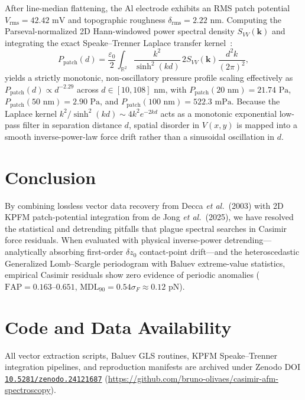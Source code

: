 \documentclass[10pt,twocolumn,a4paper]{article}
\begin{document}
After line-median flattening, the Al electrode exhibits an RMS patch potential $V_{\mathrm{rms}} = 42.42\text{ mV}$ and topographic roughness $\delta_{\mathrm{rms}} = 2.22\text{ nm}$. Computing the Parseval-normalized 2D Hann-windowed power spectral density $S_{VV}(\mathbf{k})$ and integrating the exact Speake--Trenner Laplace transfer kernel~\cite{speake2003}:
\begin{equation}
P_{\mathrm{patch}}(d) = \frac{\varepsilon_0}{2} \int_{\mathbb{R}^2} \frac{k^2}{\sinh^2(k d)}\, 2 S_{VV}(\mathbf{k}) \frac{d^2 k}{(2\pi)^2},
\label{eq:speake}
\end{equation}
yields a strictly monotonic, non-oscillatory pressure profile scaling effectively as $P_{\mathrm{patch}}(d) \propto d^{-2.29}$ across $d \in [10, 108]\text{ nm}$, with $P_{\mathrm{patch}}(20\text{ nm}) = 21.74\text{ Pa}$, $P_{\mathrm{patch}}(50\text{ nm}) = 2.90\text{ Pa}$, and $P_{\mathrm{patch}}(100\text{ nm}) = 522.3\text{ mPa}$. Because the Laplace kernel $k^2/\sinh^2(kd) \sim 4 k^2 e^{-2kd}$ acts as a monotonic exponential low-pass filter in separation distance $d$, spatial disorder in $V(x,y)$ is mapped into a smooth inverse-power-law force drift rather than a sinusoidal oscillation in $d$.

\section{Conclusion}
By combining lossless vector data recovery from Decca \textit{et al.}\ (2003) with 2D KPFM patch-potential integration from de Jong \textit{et al.}\ (2025), we have resolved the statistical and detrending pitfalls that plague spectral searches in Casimir force residuals. When evaluated with physical inverse-power detrending---analytically absorbing first-order $\delta z_0$ contact-point drift---and the heteroscedastic Generalized Lomb--Scargle periodogram with Baluev extreme-value statistics, empirical Casimir residuals show zero evidence of periodic anomalies ($\mathrm{FAP} = 0.163\text{--}0.651$, $\mathrm{MDL}_{90} = 0.54\sigma_F \approx 0.12\text{ pN}$).

\section*{Code and Data Availability}
All vector extraction scripts, Baluev GLS routines, KPFM Speake--Trenner integration pipelines, and reproduction manifests are archived under Zenodo DOI \href{https://doi.org/10.5281/zenodo.24121687}{\texttt{10.5281/zenodo.24121687}} (\url{https://github.com/bruno-olivaes/casimir-afm-spectroscopy}).
\end{document}
